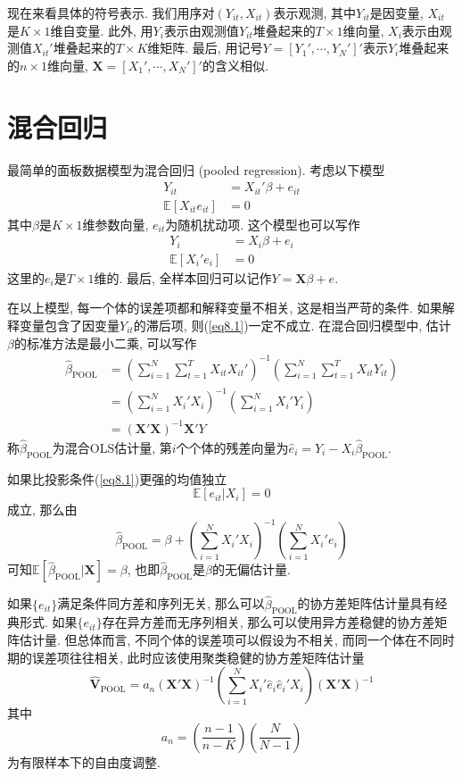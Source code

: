 \documentclass[cn, 12pt, math=mtpro2, bibstyle=apa, blue, twocol]{elegantbook}
\newcommand{\E}{\mathbb{E}}
\newcommand{\X}{\mathbold{X}}
\newcommand{\hb}{\hat{\beta}}
\newcommand{\V}{\mathbold{V}}
\begin{document}
现在来看具体的符号表示. 我们用序对$(Y_{it},X_{it})$表示观测, 其中$Y_{it}$是因变量, $X_{it}$是$K\times1$维自变量. 此外, 用$Y_i$表示由观测值$Y_{it}$堆叠起来的$T\times 1$维向量, $X_i$表示由观测值$X_{it}'$堆叠起来的$T\times K$维矩阵. 最后, 用记号$Y=[Y_1',\cdots,Y_N']'$表示$Y_i$堆叠起来的$n\times 1$维向量, $\X=[X_1',\cdots,X_N']'$的含义相似.
\section{混合回归}
最简单的面板数据模型为混合回归 (pooled regression). 考虑以下模型
\begin{align}
Y_{it}&=X_{it}'\beta+e_{it} \nonumber \\
\E[X_{it}e_{it}]&=0 \label{eq8.1}
\end{align}
其中$\beta$是$K\times1$维参数向量, $e_{it}$为随机扰动项. 这个模型也可以写作
\begin{align*}
Y_i&=X_i\beta+e_i \\
\E[X_i'e_i]&=0
\end{align*}
这里的$e_i$是$T\times1$维的. 最后, 全样本回归可以记作$Y=\X\beta+e$.

在以上模型, 每一个体的误差项都和解释变量不相关, 这是相当严苛的条件. 如果解释变量包含了因变量$Y_{it}$的滞后项, 则(\ref{eq8.1})一定不成立. 在混合回归模型中, 估计$\beta$的标准方法是最小二乘, 可以写作
\begin{align*}
\hb_{\text{POOL}}&=\left(\sum_{i=1}^{N}\sum_{t=1}^T X_{it}X_{it}'\right)^{-1}\left(\sum_{i=1}^{N}\sum_{t=1}^TX_{it}Y_{it}\right) \\
&=\left(\sum_{i=1}^{N}X_i'X_i\right)^{-1}\left(\sum_{i=1}^{N}X_i'Y_i \right) \\
&=(\X'\X)^{-1}\X'Y
\end{align*}
称$\hb_{\text{POOL}}$为混合OLS估计量, 第$i$个个体的残差向量为$\hat{e}_i=Y_i-X_i\hb_{\text{POOL}}$.

如果比投影条件(\ref{eq8.1})更强的均值独立
\begin{equation}\label{eq8.2}
  \E[e_{it}|X_i]=0
\end{equation}
成立, 那么由
$$\hb_{\text{POOL}}=\beta+\left(\sum_{i=1}^{N}X_i'X_i\right)^{-1}\left(\sum_{i=1}^{N}X_i'e_i\right)$$
可知$\E[\hb_{\text{POOL}}|\X]=\beta$, 也即$\hb_{\text{POOL}}$是$\beta$的无偏估计量.

如果$\{e_{it}\}$满足条件同方差和序列无关, 那么可以$\hb_{\text{POOL}}$的协方差矩阵估计量具有经典形式. 如果$\{e_{it}\}$存在异方差而无序列相关, 那么可以使用异方差稳健的协方差矩阵估计量. 但总体而言, 不同个体的误差项可以假设为不相关, 而同一个体在不同时期的误差项往往相关, 此时应该使用聚类稳健的协方差矩阵估计量
$$\hat{\V}_{\text{POOL}}=a_n(\X'\X)^{-1}\left(\sum_{i=1}^{N}X_i'\hat{e}_i\hat{e}_i'X_i\right)(\X'\X)^{-1}$$
其中
$$a_n=\left(\frac{n-1}{n-K}\right)\left(\frac{N}{N-1}\right)$$
为有限样本下的自由度调整.
\end{document}
